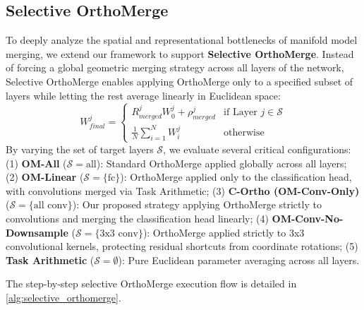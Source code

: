 \documentclass{article}
\begin{document}
\subsection{Selective OrthoMerge}
To deeply analyze the spatial and representational bottlenecks of manifold model merging, we extend our framework to support \textbf{Selective OrthoMerge}. 
Instead of forcing a global geometric merging strategy across all layers of the network, Selective OrthoMerge enables applying OrthoMerge only to a specified subset of layers while letting the rest average linearly in Euclidean space:
\begin{equation}
    W^{j}_{final} = \begin{cases}
        R^j_{merged} W^j_0 + \rho^j_{merged} & \text{if Layer } j \in \mathcal{S} \\
        \frac{1}{N} \sum_{i=1}^N W^j_i & \text{otherwise}
    \end{cases}
\end{equation}
By varying the set of target layers $\mathcal{S}$, we evaluate several critical configurations: 
(1) \textbf{OM-All} ($\mathcal{S} = \text{all}$): Standard OrthoMerge applied globally across all layers; 
(2) \textbf{OM-Linear} ($\mathcal{S} = \{\text{fc}\}$): OrthoMerge applied only to the classification head, with convolutions merged via Task Arithmetic; 
(3) \textbf{C-Ortho (OM-Conv-Only)} ($\mathcal{S} = \{\text{all conv}\}$): Our proposed strategy applying OrthoMerge strictly to convolutions and merging the classification head linearly; 
(4) \textbf{OM-Conv-No-Downsample} ($\mathcal{S} = \{\text{3x3 conv}\}$): OrthoMerge applied strictly to 3x3 convolutional kernels, protecting residual shortcuts from coordinate rotations; 
(5) \textbf{Task Arithmetic} ($\mathcal{S} = \emptyset$): Pure Euclidean parameter averaging across all layers.

The step-by-step selective OrthoMerge execution flow is detailed in \cref{alg:selective_orthomerge}.
\end{document}
